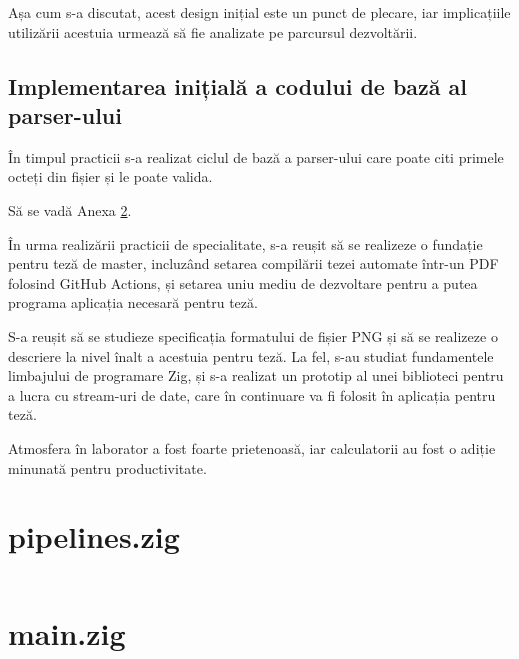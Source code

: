\documentclass[a4paper,12pt]{report}
\begin{document}
Așa cum s-a discutat, acest design inițial este un punct de plecare,
iar implicațiile utilizării acestuia urmează să fie analizate pe parcursul dezvoltării.

\subsection{Implementarea inițială a codului de bază al parser-ului}

În timpul practicii s-a realizat ciclul de bază a parser-ului care poate citi
primele octeți din fișier și le poate valida.

Să se vadă Anexa \ref{appendix:parser_prototype}.


În urma realizării practicii de specialitate,
s-a reușit să se realizeze o fundație pentru teză de master,
incluzând setarea compilării tezei automate într-un \ac{PDF} folosind GitHub Actions,
și setarea uniu mediu de dezvoltare pentru a putea programa aplicația necesară pentru teză.

S-a reușit să se studieze specificația formatului de fișier \ac{PNG}
și să se realizeze o descriere la nivel înalt a acestuia pentru teză.
La fel, s-au studiat fundamentele limbajului de programare Zig,
și s-a realizat un prototip al unei biblioteci pentru a lucra cu stream-uri de date,
care în continuare va fi folosit în aplicația pentru teză.

Atmosfera în laborator a fost foarte prietenoasă,
iar calculatorii au fost o adiție minunată pentru productivitate.

\newpage
{}




\appendix

\renewcommand{\thechapter}{\arabic{chapter}}

\setcounter{chapter}{1}


\section{pipelines.zig}\label{appendix:pipelines_prototype}
\inputminted{zig}{../src/pipelines.zig}

\clearpage\section{main.zig}\label{appendix:parser_prototype}
\inputminted{zig}{../src/main.zig}
\end{document}
